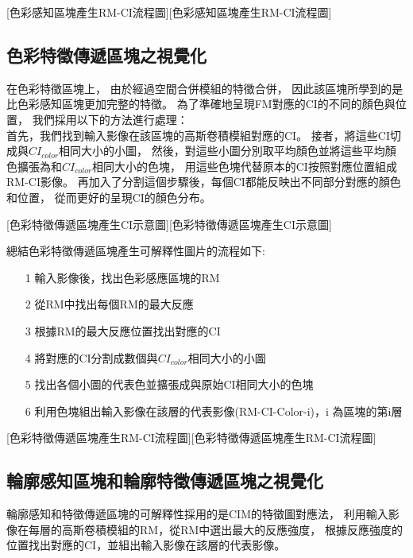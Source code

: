 \documentclass[class=NCU_thesis, crop=false]{standalone}
\begin{document}
	[色彩感知區塊產生RM-CI流程圖][色彩感知區塊產生RM-CI流程圖]

	\pagebreak

	\subsection{色彩特徵傳遞區塊之視覺化}
	在色彩特徵區塊上，
	由於經過空間合併模組的特徵合併，
	因此該區塊所學到的是比色彩感知區塊更加完整的特徵。
	為了準確地呈現FM對應的CI的不同的顏色與位置，
	我們採用以下的方法進行處理：\\
	首先，我們找到輸入影像在該區塊的高斯卷積模組對應的CI。
	接者，將這些CI切成與$CI_{color}$相同大小的小圖，
	然後，對這些小圖分別取平均顏色並將這些平均顏色擴張為和$CI_{color}$相同大小的色塊，
	用這些色塊代替原本的CI按照對應位置組成RM-CI影像。
	再加入了分割這個步驟後，每個CI都能反映出不同部分對應的顏色和位置，
	從而更好的呈現CI的顏色分布。

	[色彩特徵傳遞區塊產生CI示意圖][色彩特徵傳遞區塊產生CI示意圖]

	總結色彩特徵傳遞區塊產生可解釋性圖片的流程如下:
	\begin{itemize}
		\item [1]
		輸入影像後，找出色彩感應區塊的RM
		\item [2]
		從RM中找出每個RM的最大反應
		\item [3]
		根據RM的最大反應位置找出對應的CI
		\item [4]
		將對應的CI分割成數個與$CI_{color}$相同大小的小圖
		\item [5]
		找出各個小圖的代表色並擴張成與原始CI相同大小的色塊
		\item [6]
		利用色塊組出輸入影像在該層的代表影像(RM-CI-Color-i)，i 為區塊的第i層
	\end{itemize}

	[色彩特徵傳遞區塊產生RM-CI流程圖][色彩特徵傳遞區塊產生RM-CI流程圖]
	\pagebreak

	\subsection{輪廓感知區塊和輪廓特徵傳遞區塊之視覺化}
	輪廓感知和特徵傳遞區塊的可解釋性採用的是CIM的特徵圖對應法，
	利用輸入影像在每層的高斯卷積模組的RM，從RM中選出最大的反應強度，
	根據反應強度的位置找出對應的CI，並組出輸入影像在該層的代表影像。
\end{document}
